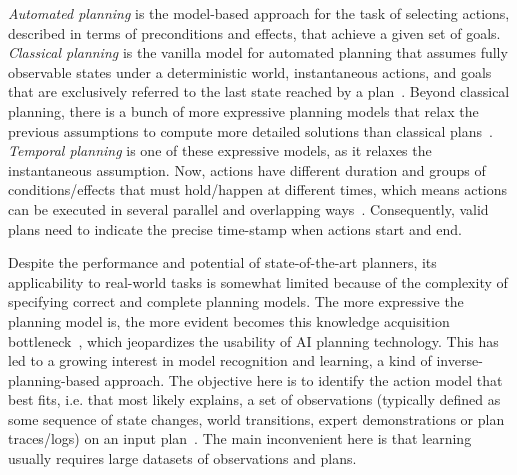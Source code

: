 \documentclass[runningheads]{llncs}
\begin{document}
{\em Automated planning} is the model-based approach for the task of selecting actions, described in terms of preconditions and effects, that achieve a given set of goals. {\em Classical planning} is the vanilla model for automated planning that assumes fully observable states under a deterministic world, instantaneous actions, and goals that are exclusively referred to the last state reached by a plan~\cite{geffner2013concise,ghallab2004automated}. Beyond classical planning, there is a bunch of more expressive planning models that relax the previous assumptions to compute more detailed solutions than classical plans~\cite{ghallab2004automated}. {\em Temporal planning} is one of these expressive models, as it relaxes the instantaneous assumption. Now, actions have different duration and groups of conditions/effects that must hold/happen at different times, which means actions can be executed in several parallel and overlapping ways~\cite{cushing2007temporal,fox2003pddl2}. Consequently, valid plans need to indicate the precise time-stamp when actions start and end.

Despite the performance and potential of state-of-the-art planners, its applicability to real-world tasks is somewhat limited because of the complexity of specifying correct and complete planning models. The more expressive the planning model is, the more evident becomes this knowledge acquisition bottleneck~\cite{kambhampati2007model}, which jeopardizes the usability of AI planning technology. This has led to a growing interest in model recognition and learning, a kind of inverse-planning-based approach. The objective here is to identify the action model that best fits, i.e. that most likely explains, a set of observations (typically defined as some sequence of state changes, world transitions, expert demonstrations or plan traces/logs) on an input plan~\cite{aineto2018icaps,aineto2019icaps,bonet2009icaps,cresswell2013,geffner2013concise,ramirez2012,segovia2016ijcai}. The main inconvenient here is that learning usually requires large datasets of observations and plans.
\end{document}
